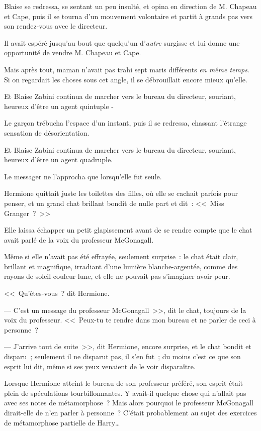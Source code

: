 Blaise se redressa, se sentant un peu insulté, et opina en direction de M. Chapeau et Cape, puis il se tourna d'un mouvement volontaire et partit à grands pas vers son rendez-vous avec le directeur.

Il avait espéré jusqu'au bout que quelqu'un d'\emph{autre} surgisse et lui donne une opportunité de vendre M. Chapeau et Cape.

Mais après tout, maman n'avait pas trahi sept maris différents \emph{en même temps}. Si on regardait les choses sous cet angle, il se débrouillait encore mieux qu'elle.

Et Blaise Zabini continua de marcher vers le bureau du directeur, souriant, heureux d'être un agent quintuple -

Le garçon trébucha l'espace d'un instant, puis il se redressa, chassant l'étrange sensation de désorientation.

Et Blaise Zabini continua de marcher vers le bureau du directeur, souriant, heureux d'être un agent quadruple.


Le messager ne l'approcha que lorsqu'elle fut seule.

Hermione quittait juste les toilettes des filles, où elle se cachait parfois pour penser, et un grand chat brillant bondit de nulle part et dit~: <<~Miss Granger~?~>>

Elle laissa échapper un petit glapissement avant de se rendre compte que le chat avait parlé de la voix du professeur McGonagall.

Même si elle n'avait pas été effrayée, seulement surprise~: le chat était clair, brillant et magnifique, irradiant d'une lumière blanche-argentée, comme des rayons de soleil couleur lune, et elle ne pouvait pas s'imaginer avoir peur.

<<~Qu'êtes-vous~? dit Hermione.

--- C'est un message du professeur McGonagall~>>, dit le chat, toujours de la voix du professeur. <<~Peux-tu te rendre dans mon bureau et ne parler de ceci à personne~?

--- J'arrive tout de suite~>>, dit Hermione, encore surprise, et le chat bondit et disparu~; seulement il ne disparut pas, il s'en fut~; du moins c'est ce que son esprit lui dit, même si ses yeux venaient de le voir disparaître.

Lorsque Hermione atteint le bureau de son professeur préféré, son esprit était plein de spéculations tourbillonnantes. Y avait-il quelque chose qui n'allait pas avec ses notes de métamorphose~? Mais alors pourquoi le professeur McGonagall dirait-elle de n'en parler à personne~? C'était probablement au sujet des exercices de métamorphose partielle de Harry…

